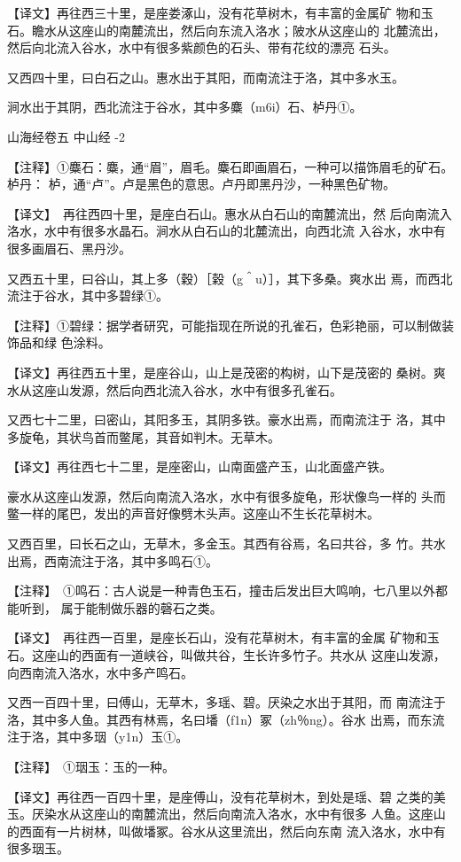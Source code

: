 \documentclass[a4paper,12pt,UTF8,twoside]{ctexbook}
\begin{document}
【译文】再往西三十里，是座娄涿山，没有花草树木，有丰富的金属矿 物和玉石。瞻水从这座山的南麓流出，然后向东流入洛水；陂水从这座山的 北麓流出，然后向北流入谷水，水中有很多紫颜色的石头、带有花纹的漂亮 石头。

又西四十里，曰白石之山。惠水出于其阳，而南流注于洛，其中多水玉。

涧水出于其阴，西北流注于谷水，其中多麋（m6i）石、栌丹①。


山海经卷五 中山经 -2

【注释】①麋石：麋，通“眉”，眉毛。麋石即画眉石，一种可以描饰眉毛的矿石。栌丹： 栌，通“卢”。卢是黑色的意思。卢丹即黑丹沙，一种黑色矿物。

【译文】　再往西四十里，是座白石山。惠水从白石山的南麓流出，然 后向南流入洛水，水中有很多水晶石。涧水从白石山的北麓流出，向西北流 入谷水，水中有很多画眉石、黑丹沙。

又西五十里，曰谷山，其上多（穀）［榖（g＾u）］，其下多桑。爽水出 焉，而西北流注于谷水，其中多碧绿①。

【注释】①碧绿：据学者研究，可能指现在所说的孔雀石，色彩艳丽，可以制做装饰品和绿 色涂料。

【译文】再往西五十里，是座谷山，山上是茂密的构树，山下是茂密的 桑树。爽水从这座山发源，然后向西北流入谷水，水中有很多孔雀石。

又西七十二里，曰密山，其阳多玉，其阴多铁。豪水出焉，而南流注于 洛，其中多旋龟，其状鸟首而鳖尾，其音如判木。无草木。

【译文】再往西七十二里，是座密山，山南面盛产玉，山北面盛产铁。

豪水从这座山发源，然后向南流入洛水，水中有很多旋龟，形状像鸟一样的 头而鳖一样的尾巴，发出的声音好像劈木头声。这座山不生长花草树木。

又西百里，曰长石之山，无草木，多金玉。其西有谷焉，名曰共谷，多 竹。共水出焉，西南流注于洛，其中多鸣石①。

【注释】　①鸣石：古人说是一种青色玉石，撞击后发出巨大鸣响，七八里以外都能听到， 属于能制做乐器的磬石之类。

【译文】　再往西一百里，是座长石山，没有花草树木，有丰富的金属 矿物和玉石。这座山的西面有一道峡谷，叫做共谷，生长许多竹子。共水从 这座山发源，向西南流入洛水，水中多产鸣石。

又西一百四十里，曰傅山，无草木，多瑶、碧。厌染之水出于其阳，而 南流注于洛，其中多人鱼。其西有林焉，名曰墦（f1n）冢（zh％ng）。谷水 出焉，而东流注于洛，其中多珚（y1n）玉①。

【注释】　①珚玉：玉的一种。

【译文】再往西一百四十里，是座傅山，没有花草树木，到处是瑶、碧 之类的美玉。厌染水从这座山的南麓流出，然后向南流入洛水，水中有很多 人鱼。这座山的西面有一片树林，叫做墦冢。谷水从这里流出，然后向东南 流入洛水，水中有很多珚玉。
\end{document}

